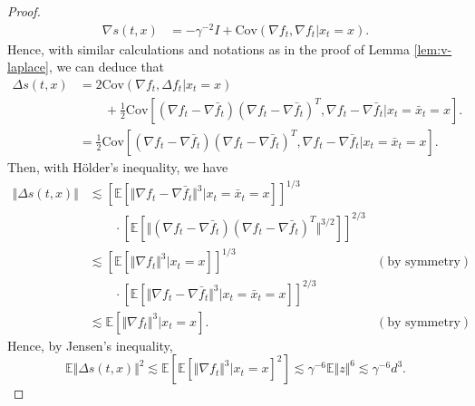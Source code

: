 \begin{proof}
    $$\begin{aligned}
        \nabla s(t,x)&=-\gamma^{-2}I+\text{Cov}(\nabla f_t,\nabla f_t|x_t=x).
    \end{aligned}$$
    Hence, with similar calculations and notations as in the proof of Lemma \ref{lem:v-laplace}, we can deduce that
    $$\begin{aligned}
        \Delta s(t,x)&=2\text{Cov}(\nabla f_t,\Delta f_t|x_t=x)\\
        &\qquad+\frac{1}{2}\text{Cov}[(\nabla f_t-\nabla\bar{f}_t)(\nabla f_t-\nabla\bar{f}_t)^T,\nabla f_t-\nabla\bar{f}_t|x_t=\bar{x}_t=x].\\
        &=\frac{1}{2}\text{Cov}[(\nabla f_t-\nabla\bar{f}_t)(\nabla f_t-\nabla\bar{f}_t)^T,\nabla f_t-\nabla\bar{f}_t|x_t=\bar{x}_t=x].
    \end{aligned}$$
    Then, with H\"older's inequality, we have
    $$\begin{aligned}
        \Vert\Delta s(t,x)\Vert&\lesssim\left[\mathbb{E}[\Vert\nabla f_t-\nabla\bar{f}_t\Vert^3|x_t=\bar{x}_t=x]\right]^{1/3}\\
        &\qquad\cdot\left[\mathbb{E}[\Vert(\nabla f_t-\nabla\bar{f}_t)(\nabla f_t-\nabla\bar{f}_t)^T\Vert^{3/2}]\right]^{2/3}\\
        &\lesssim\left[\mathbb{E}[\Vert\nabla f_t\Vert^3|x_t=x]\right]^{1/3}&(\text{by symmetry})\\
        &\qquad\cdot\left[\mathbb{E}[\Vert\nabla f_t-\nabla\bar{f}_t\Vert^3|x_t=\bar{x}_t=x]\right]^{2/3}\\
        &\lesssim\mathbb{E}[\Vert\nabla f_t\Vert^3|x_t=x].&(\text{by symmetry})
    \end{aligned}$$
    Hence, by Jensen's inequality, $$\mathbb{E}\Vert\Delta s(t,x)\Vert^2\lesssim\mathbb{E}[\mathbb{E}[\Vert\nabla f_t\Vert^3|x_t=x]^2]\lesssim\gamma^{-6}\mathbb{E}\Vert z\Vert^6\lesssim\gamma^{-6}d^3.$$
\end{proof}

